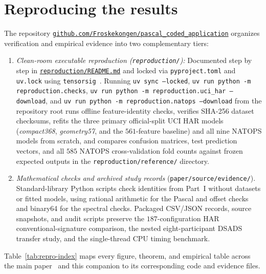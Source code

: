 \section*{Reproducing the results}\label{app:reproducibility}

The repository
\href{https://github.com/Froskekongen/pascal_coded_application}{\nolinkurl{github.com/Froskekongen/pascal_coded_application}}
organizes verification and empirical evidence into two complementary tiers:
\begin{enumerate}
\item \emph{Clean-room executable reproduction (\nolinkurl{reproduction/}):}
Documented step by step in
\href{https://github.com/Froskekongen/pascal_coded_application/blob/main/reproduction/README.md}{\nolinkurl{reproduction/README.md}}
and locked via \nolinkurl{pyproject.toml} and \nolinkurl{uv.lock} using
\texttt{tensorsig}~\cite{tensorsig}. Running \texttt{uv sync --locked},
\texttt{uv run python -m reproduction.checks},
\texttt{uv run python -m reproduction.uci\_har --download}, and
\texttt{uv run python -m reproduction.natops --download} from the repository root
runs offline feature-identity checks, verifies SHA-256 dataset checksums, refits
the three primary official-split UCI HAR models (\emph{compact368},
\emph{geometry57}, and the \(561\)-feature baseline) and all nine NATOPS models
from scratch, and compares confusion matrices, test prediction vectors, and all
\(585\) NATOPS cross-validation fold counts against frozen expected outputs in
the \nolinkurl{reproduction/reference/} directory.
\item \emph{Mathematical checks and archived study records}
(\nolinkurl{paper/source/evidence/}). Standard-library Python scripts check
identities from Part~I without datasets or fitted models, using rational
arithmetic for the Pascal and offset checks and binary64 for the spectral
checks. Packaged CSV/JSON records, source snapshots, and audit scripts preserve the
\(187\)-configuration HAR conventional-signature comparison, the nested
eight-participant DSADS transfer study, and the single-thread CPU timing
benchmark.
\end{enumerate}

Table~\ref{tab:repro-index} maps every figure, theorem, and empirical table across
the main paper~\cite{mainpaper} and this companion to its corresponding
code and evidence files.

